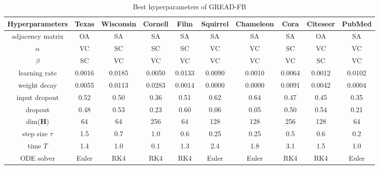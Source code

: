 \documentclass{article}
\theoremstyle{plain}
\theoremstyle{definition}
\theoremstyle{remark}
\begin{document}
\begin{table*}[ht!]
    \centering
    \small
    \caption{Best hyperparameters of GREAD-FB}
    \label{tab:best_FB}
    \begin{tabular}{c ccccccccc} \toprule
        Hyperparameters  & Texas  & Wisconsin 
                                          & Cornell& Film   & Squirrel 
                                                                      & Chameleon
                                                                               & Cora   & Citeseer 
                                                                                                 & PubMed\\ \midrule
        adjacency matrix & OA     & SA     & SA     & SA     & SA     & SA     & SA     & OA     & SA    \\
        $\alpha$         & VC     & SC     & SC     & SC     & VC     & VC     & SC     & VC     & VC    \\
        $\beta$          & SC     & VC     & VC     & VC     & VC     & VC     & VC     & SC     & VC    \\
        learning rate    & 0.0016 & 0.0185 & 0.0050 & 0.0133 & 0.0090 & 0.0010 & 0.0064 & 0.0012 & 0.0102\\
        weight decay     & 0.0055 & 0.0113 & 0.0283 & 0.0014 & 0.0000 & 0.0000 & 0.0091 & 0.0042 & 0.0004\\
        input dropout    & 0.52   & 0.50   & 0.36   & 0.51   & 0.62   & 0.64   & 0.47   & 0.45   & 0.35\\
        dropout          & 0.48   & 0.53   & 0.23   & 0.60   & 0.06   & 0.05   & 0.50   & 0.54   & 0.21\\
        dim($\mathbf{H}$)& 64     & 64     & 256    & 64     & 128    & 128    & 256    & 128    & 64\\
        step size $\tau$ & 1.5    & 0.7    & 1.0    & 0.6    & 0.25   & 0.25   & 0.5    & 0.6    & 0.2\\
        time $T$         & 1.4    & 1.0    & 0.1    & 1.3    & 2.4    & 1.8    & 3.1    & 1.5    & 1.0\\
        ODE solver       & Euler  & RK4    & RK4    & RK4    & Euler  & Euler  & RK4    & RK4    & Euler  \\
        \bottomrule
    \end{tabular}
\end{table*}
\end{document}
